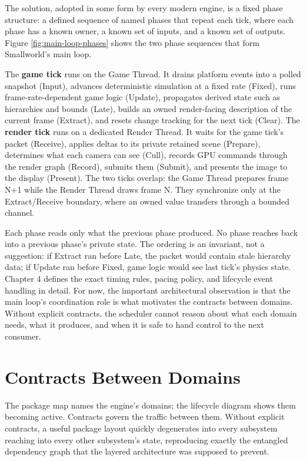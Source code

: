 \documentclass[
  11pt,
  letterpaper,
  DIV=11,
  numbers=noendperiod,
  twoside,
  open=right]{scrreprt}
\begin{document}
The solution, adopted in some form by every modern engine, is a fixed
phase structure: a defined sequence of named phases that repeat each
tick, where each phase has a known owner, a known set of inputs, and a
known set of outputs. Figure \ref{fig:main-loop-phases} shows the two
phase sequences that form Smallworld's main loop.



The \textbf{game tick} runs on the Game Thread. It drains platform
events into a polled snapshot (Input), advances deterministic simulation
at a fixed rate (Fixed), runs frame-rate-dependent game logic (Update),
propagates derived state such as hierarchies and bounds (Late), builds
an owned render-facing description of the current frame (Extract), and
resets change tracking for the next tick (Clear). The \textbf{render
tick} runs on a dedicated Render Thread. It waits for the game tick's
packet (Receive), applies deltas to its private retained scene
(Prepare), determines what each camera can see (Cull), records GPU
commands through the render graph (Record), submits them (Submit), and
presents the image to the display (Present). The two ticks overlap: the
Game Thread prepares frame N+1 while the Render Thread draws frame N.
They synchronize only at the Extract/Receive boundary, where an owned
value transfers through a bounded channel.

Each phase reads only what the previous phase produced. No phase reaches
back into a previous phase's private state. The ordering is an
invariant, not a suggestion: if Extract ran before Late, the packet
would contain stale hierarchy data; if Update ran before Fixed, game
logic would see last tick's physics state. Chapter 4 defines the exact
timing rules, pacing policy, and lifecycle event handling in detail. For
now, the important architectural observation is that the main loop's
coordination role is what motivates the contracts between domains.
Without explicit contracts, the scheduler cannot reason about what each
domain needs, what it produces, and when it is safe to hand control to
the next consumer.

\section{Contracts Between Domains}\label{contracts-between-domains}

The package map names the engine's domains; the lifecycle diagram shows
them becoming active. Contracts govern the traffic between them. Without
explicit contracts, a useful package layout quickly degenerates into
every subsystem reaching into every other subsystem's state, reproducing
exactly the entangled dependency graph that the layered architecture was
supposed to prevent.
\end{document}
